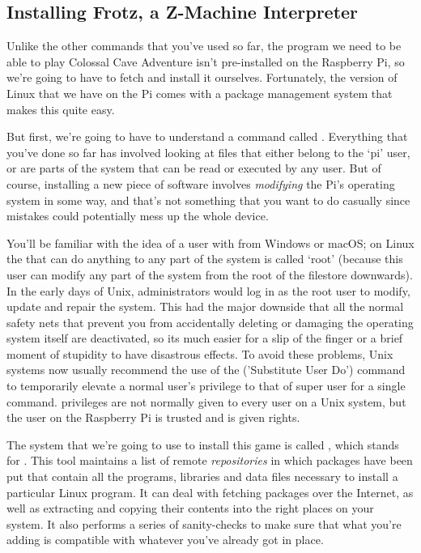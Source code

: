 \FloatBarrier
\subsection{Installing Frotz, a Z-Machine Interpreter}

Unlike the other commands that you've used so far, the program we need to be able to play Colossal Cave Adventure isn't pre-installed on the Raspberry Pi, so we're going to have to fetch and install it ourselves. Fortunately, the version of Linux that we have on the Pi comes with a package management system that makes this quite easy.

But first, we're going to have to understand a command called . Everything that you've done so far has involved looking at files that either belong to the `pi' user, or are parts of the system that can be read or executed by any user. But of course, installing a new piece of software involves \textit{modifying} the Pi's operating system in some way, and that's not something that you want to do casually since mistakes could potentially mess up the whole device.

You'll be familiar with the idea of a user with  from Windows or macOS; on Linux the  that can do anything to any part of the system is called `root' (because this user can modify any part of the system from the root of the filestore downwards). In the early days of Unix, administrators would log in as the root user to modify, update and repair the system. This had the major downside that all the normal safety nets that prevent you from accidentally deleting or damaging the operating system itself are deactivated, so its much easier for a slip of the finger or a brief moment of stupidity to have disastrous effects. To avoid these problems, Unix systems now usually recommend the use of the  ('Substitute User Do') command to temporarily elevate a normal user's privilege to that of super user for a single command.  privileges are not normally given to every user on a Unix system, but the user  on the Raspberry Pi is trusted and is given  rights.

The system that we're going to use to install this game is called , which stands for . This tool maintains a list of remote \textit{repositories} in which packages have been put that contain all the programs, libraries and data files necessary to install a particular Linux program. It can deal with fetching packages over the Internet, as well as extracting and copying their contents into the right places on your system. It also performs a series of sanity-checks to make sure that what you're adding is compatible with whatever you've already got in place.

